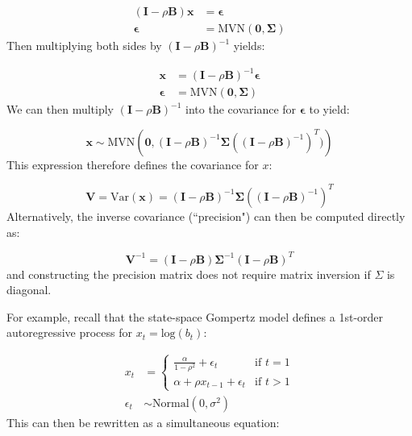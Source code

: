 \begin{equation}
\begin{aligned}
    (\mathbf{I} - \rho \mathbf{B}) \mathbf{x} &= \mathbf{\epsilon} \\
    \mathbf{\epsilon} &= \mathrm{MVN}( \mathbf{0, \Sigma} )
\end{aligned}
\end{equation}
Then multiplying both sides by \(  (\mathbf{I} - \rho \mathbf{B})^{-1} \) yields:

\begin{equation}
\begin{aligned}
    \mathbf{x}  &= (\mathbf{I} - \rho \mathbf{B})^{-1} \mathbf{\epsilon} \\
    \mathbf{\epsilon} &= \mathrm{MVN}( \mathbf{0, \Sigma} )
\end{aligned}
\end{equation}
We can then multiply \( (\mathbf{I} - \rho \mathbf{B})^{-1} \) into the covariance for \( \mathbf{\epsilon} \) to yield:

\begin{equation}
    \mathbf{x} \sim \mathrm{MVN}\left( \mathbf{0}, (\mathbf{I} - \rho \mathbf{B})^{-1} \mathbf{\Sigma} ((\mathbf{I} - \rho \mathbf{B})^{-1})^T ) \right)
\end{equation}
This expression therefore defines the covariance for \(x\):

\begin{equation}  \label{eq:Appendix_SAR_covariance}
    \mathbf{V} = \mathrm{Var}(\mathbf{x}) = (\mathbf{I} - \rho \mathbf{B})^{-1} \mathbf{\Sigma} ((\mathbf{I} - \rho \mathbf{B})^{-1})^T
\end{equation}
Alternatively, the inverse covariance (``precision") can then be computed directly as:

\begin{equation} \label{eq:Appendix_SAR_precision}
    \mathbf{V}^{-1} = (\mathbf{I} - \rho \mathbf{B}) \mathbf{\Sigma}^{-1} (\mathbf{I} - \rho \mathbf{B})^T
\end{equation}
and constructing the precision matrix does not require matrix inversion if \(\Sigma\) is diagonal. 

For example, recall that the state-space Gompertz model defines a 1st-order autoregressive process for \(x_t = \mathrm{log}(b_t) \):

\begin{equation}
\begin{aligned}
    x_t & = 
    \begin{cases}
        \frac{\alpha}{1-\rho^2} + \epsilon_t & \text{if } t=1 \\ 
        \alpha + \rho x_{t-1} + \epsilon_t & \text{if } t>1 
    \end{cases} \\
    \epsilon_t & \sim \mathrm{Normal}( 0, \sigma^2) 
\end{aligned}
\end{equation}
This can then be rewritten as a simultaneous equation:

